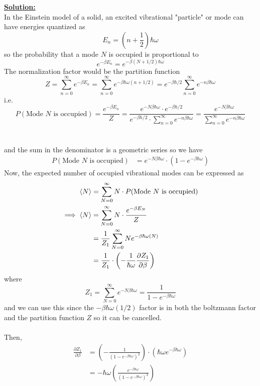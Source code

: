 \documentclass[11pt]{article}
\begin{document}
\vskip 0.5cm
\textbf{\underline{Solution:}}\\
In the Einstein model of a solid, an excited vibrational "particle" or mode can have energies quantized as $$ E_n = \left( n + \frac{1}{2} \right) \hbar \omega $$ so the probability that a mode $N$ is occupied is proportional to 
$$ e^{-\beta E_n } = e^{-\beta \left(N + 1/2\right)\hbar \omega}$$
The normalization factor would be the partition function 
$$ Z = \sum_{n = 0}^{\infty} e^{-\beta E_n} = \sum_{n = 0}^{\infty} e^{-\beta \hbar \omega \left(n + 1/2\right)} = e^{-\beta \hbar / 2} \sum_{n = 0}^{\infty} e^{- n \beta \hbar \omega}$$
i.e. 
$$ P\left(\text{Mode } N \text{ is occupied} \right) = \frac{e^{-\beta E_n}}{Z} = \frac{e^{- N \beta \hbar \omega} \cdot  e^{-\beta \hbar / 2}}{ e^{-\beta \hbar / 2} \cdot \sum_{n = 0}^{\infty} e^{- n \beta \hbar \omega} } = \frac{e^{-N\beta\hbar\omega}}{\sum_{n = 0}^{\infty} e^{- n \beta \hbar \omega}}$$
\\
\\
and the sum in the denominator is a geometric series so we have 
\begin{align*}
  P\left(\text{Mode } N \text{ is occupied}\right) &= e^{-N\beta\hbar\omega} \cdot \left(1 - e^{-\beta \hbar \omega}\right)
\end{align*} Now, the expected number of occupied vibrational modes can be expressed as 
\begin{align*}
  \langle N \rangle &= \sum_{N = 0}^{\infty} N \cdot P(\text{Mode } N \text{ is occupied}) \\
  \implies \langle N \rangle &= \sum_{N = 0}^{\infty} N \cdot \frac{e^{-\beta E_N}}{Z} \\
  &= \frac{1}{Z_1} \sum_{N = 0}^{\infty} Ne^{-\beta \hbar \omega \left(N \right)} \\
  &= \frac{1}{Z_1} \cdot \left( - \frac{1}{\hbar \omega} \frac{\partial Z_1}{\partial \beta} \right) \\
\end{align*} where $$Z_1 = \sum_{N = 0}^{\infty} e^{-N\beta \hbar \omega} = \frac{1}{1-e^{-\beta\hbar\omega}} $$ and we can use this since the $-\beta \hbar \omega (1/2)$ factor is in both the boltzmann factor and the partition function $Z$ so it can be cancelled.
\\
\\
Then,
\begin{align*}
  \frac{\partial Z_1}{\partial \beta} &= \left(-\frac{1}{(1-e^{-\beta\hbar\omega})^2} \right) \cdot \left(\hbar \omega e^{-\beta \hbar \omega}\right) \\
  &=-\hbar \omega \left( \frac{e^{-\beta \hbar \omega}}{\left(1-e^{-\beta \hbar \omega}\right)^2} \right)
\end{align*}
\end{document}
